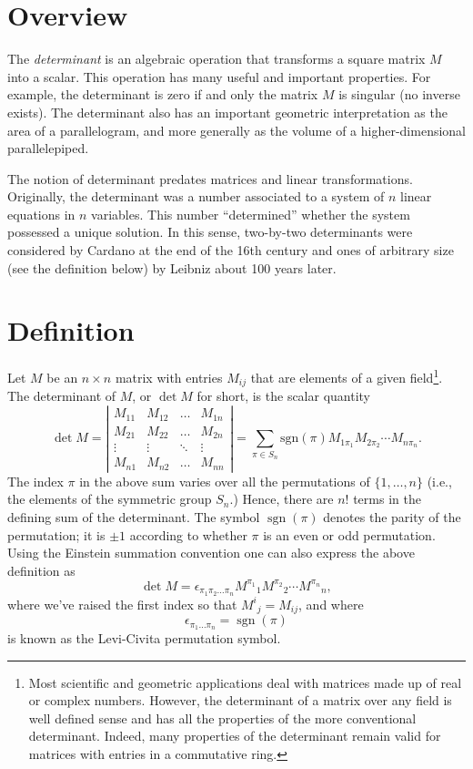 \documentclass[12pt]{article}
\begin{document}
\section*{Overview}

The \emph{determinant} is an algebraic operation that transforms a
square matrix $M$ into a scalar. This operation has many useful and
important properties.  For example, the determinant is zero if and
only the matrix $M$ is singular (no inverse exists).  The determinant
also has an important geometric interpretation as the area of a
parallelogram, and more generally as the volume of a
higher-dimensional parallelepiped.

The notion of determinant predates matrices and linear
transformations. Originally, the determinant was a number associated
to a system of $n$ linear equations in $n$ variables. This number
``determined'' whether the system possessed a unique solution.  In
this sense, two-by-two determinants were considered by Cardano at the
end of the 16th century and ones of arbitrary size (see the definition
below) by Leibniz about 100 years later.

\section*{Definition}

Let $M$ be an $n\times n$ matrix with entries $M_{ij}$ that are
elements of a given field\footnote{Most scientific and geometric
applications deal with matrices made up of real or complex numbers.
However, the determinant of a matrix over any field is well defined
sense and has all the properties of the more conventional
determinant. Indeed, many properties of the determinant remain
valid for matrices with entries in a commutative ring.}. The
determinant of $M$, or $\det M$ for short, is the scalar quantity
\begin{equation}
\label{eq:detdef}
\det M = \left|
\begin{array}{cccc}
M_{11} & M_{12} &\ldots & M_{1n} \\
M_{21} & M_{22} & \ldots & M_{2n}\\
\vdots & \vdots & \ddots & \vdots \\
M_{n1} & M_{n2} & \ldots & M_{nn}
\end{array}\right| = \sum_{\pi\in S_n} \mathrm{sgn}(\pi) M_{1\pi_1}
M_{2\pi_2}\cdots
M_{n\pi_n}.
\end{equation}
The index $\pi$ in the above sum varies over all the permutations of
$\{1,\ldots,n\}$ (i.e., the elements of the symmetric group $S_n$.)
Hence, there are $n!$ terms in the defining sum of the determinant.
The symbol $\operatorname{sgn}(\pi)$ denotes the parity of the
permutation; it is $\pm 1$ according to whether $\pi$ is an even or
odd permutation.  Using the Einstein summation convention one can also
express the above definition as
\begin{equation}
  \det M = \epsilon_{\pi_1\pi_2\dots \pi_n} M^{\pi_1}{}_1  M^{\pi_2}{}_2
  \cdots  M^{\pi_n}{}_{n},
\end{equation}
where we've raised the first index so that $M^i{}_j = M_{ij}$, and
where 
\[\epsilon_{\pi_1\dots \pi_n} = \operatorname{sgn}(\pi)\]
is known as the Levi-Civita permutation symbol.
\end{document}
